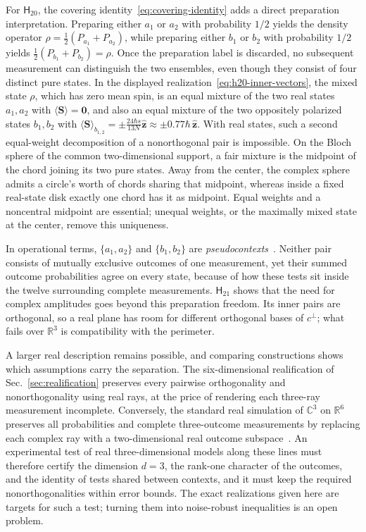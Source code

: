 \documentclass[twocolumn,aps,pra,floatfix,amsmath,amssymb,longbibliography]{revtex4-2}
\newenvironment{handrewrite}{\leavevmode\color{blue}}{}
\theoremstyle{definition}
\theoremstyle{remark}
\newcommand{\C}{\mathbb C}
\newcommand{\R}{\mathbb R}
\newcommand{\Htwenty}{\mathsf H_{20}}
\newcommand{\Htwentyone}{\mathsf H_{21}}
\begin{document}
\begin{handrewrite}
For $\Htwenty$, the covering identity~\eqref{eq:covering-identity} adds a
direct preparation interpretation.  Preparing either $a_1$ or $a_2$ with
probability $1/2$ yields the density operator
$\rho=\tfrac12(P_{a_1}+P_{a_2})$, while preparing either $b_1$ or $b_2$ with
probability $1/2$ yields $\tfrac12(P_{b_1}+P_{b_2})=\rho$.  Once the
preparation label is discarded, no subsequent measurement can distinguish the
two ensembles, even though they consist of four distinct pure states.  In the
displayed realization~\eqref{eq:h20-inner-vectors}, the mixed state $\rho$,
which has zero mean spin, is an equal mixture of the two real states $a_1,a_2$
with $\langle\mathbf S\rangle=\mathbf 0$, and also an equal mixture of the two
oppositely polarized states $b_1,b_2$ with
$\langle\mathbf S\rangle_{b_{1,2}}=\pm\frac{24\hbar s}{13N}\hat{\mathbf z}\approx\pm0.77\hbar\,\hat{\mathbf z}$.
With real states, such a second equal-weight decomposition of a nonorthogonal
pair is impossible.  On the Bloch sphere of the common two-dimensional
support, a fair mixture is the midpoint of the chord joining its two pure
states.  Away from the center, the complex sphere admits a circle's worth of
chords sharing that midpoint, whereas inside a fixed real-state disk exactly
one chord has it as midpoint.  Equal weights and a noncentral midpoint are
essential; unequal weights, or the maximally mixed state at the center, remove
this uniqueness.

In operational terms, $\{a_1,a_2\}$ and $\{b_1,b_2\}$ are
\emph{pseudocontexts}~\cite{2026-Navara-Svozil-pseudocontexts}.  Neither pair
consists of mutually exclusive outcomes of one measurement, yet their summed
outcome probabilities agree on every state, because of how these tests sit
inside the twelve surrounding complete measurements.  $\Htwentyone$ shows
that the need for complex amplitudes goes beyond this preparation freedom.
Its inner pairs are orthogonal, so a real plane has room for different
orthogonal bases of $c^\perp$; what fails over $\R^3$ is compatibility with
the perimeter.

A larger real description remains possible, and comparing constructions
shows which assumptions carry the separation.  The six-dimensional realification of Sec.~\ref{sec:realification}
preserves every pairwise orthogonality and nonorthogonality using real rays,
at the price of rendering each three-ray measurement incomplete.  Conversely,
the standard real simulation of $\C^3$ on $\R^6$ preserves all probabilities
and complete three-outcome measurements by replacing each complex ray with a
two-dimensional real outcome
subspace~\cite{McKague2009SimulatingRealHilbert,Aleksandrova2013UniversalQubit}.
An experimental test of real three-dimensional models along these lines
must therefore certify the dimension $d=3$, the rank-one character of the
outcomes, and the identity of tests shared between contexts, and it must
keep the required nonorthogonalities within error bounds.  The exact
realizations given here are targets for such a test; turning them into
noise-robust inequalities is an open problem.
\end{handrewrite}
\end{document}
